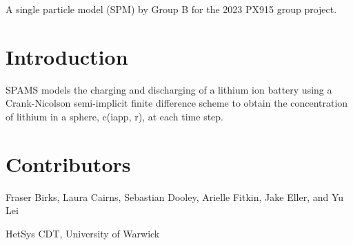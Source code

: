 A single particle model (S\-P\-M) by Group B for the 2023 P\-X915 group project. \hypertarget{index_Intro}{}\section{Introduction}\label{index_Intro}
S\-P\-A\-M\-S models the charging and discharging of a lithium ion battery using a Crank-\/\-Nicolson semi-\/implicit finite difference scheme to obtain the concentration of lithium in a sphere, c(iapp, r), at each time step. \hypertarget{index_Contributors}{}\section{Contributors}\label{index_Contributors}
Fraser Birks, Laura Cairns, Sebastian Dooley, Arielle Fitkin, Jake Eller, and Yu Lei

Het\-Sys C\-D\-T, University of Warwick 